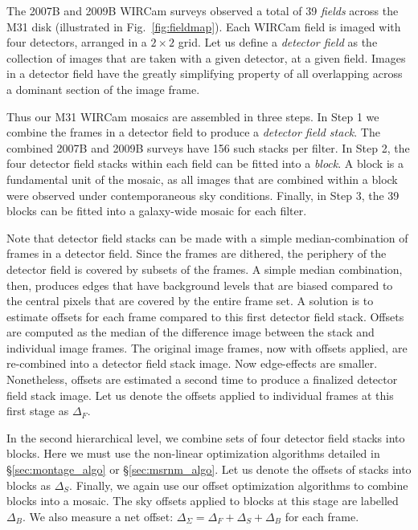 \documentclass[iop]{emulateapj}
\newcommand{\Fig}[1]{Fig.~\ref{fig:#1}}  %
\newcommand{\Sec}[1]{\S\ref{sec:#1}}  %
\begin{document}
The 2007B and 2009B WIRCam surveys observed a total of 39 \emph{fields} across the M31 disk (illustrated in \Fig{fieldmap}).
Each WIRCam field is imaged with four detectors, arranged in a $2\times 2$ grid.
Let us define a \emph{detector field} as the collection of images that are taken with a given detector, at a given field.
Images in a detector field have the greatly simplifying property of all overlapping across a dominant section of the image frame.

Thus our M31 WIRCam mosaics are assembled in three steps.
In Step 1 we combine the frames in a detector field to produce a \emph{detector field stack}.
The combined 2007B and 2009B surveys have 156 such stacks per filter.
In Step 2, the four detector field stacks within each field can be fitted into a \emph{block}.
A block is a fundamental unit of the mosaic, as all images that are combined within a block were observed under contemporaneous sky conditions.
Finally, in Step 3, the 39 blocks can be fitted into a galaxy-wide mosaic for each filter.

Note that detector field stacks can be made with a simple median-combination of frames in a detector field.
Since the frames are dithered, the periphery of the detector field is covered by subsets of the frames.
A simple median combination, then, produces edges that have background levels that are biased compared to the central pixels that are covered by the entire frame set.
A solution is to estimate offsets for each frame compared to this first detector field stack.
Offsets are computed as the median of the difference image between the stack and individual image frames.
The original image frames, now with offsets applied, are re-combined into a detector field stack image.
Now edge-effects are smaller.
Nonetheless, offsets are estimated a second time to produce a finalized detector field stack image.
Let us denote the offsets applied to individual frames at this first stage as $\Delta_F$.

In the second hierarchical level, we combine sets of four detector field stacks into blocks.
Here we must use the non-linear optimization algorithms detailed in \Sec{montage_algo} or \Sec{msrnm_algo}.
Let us denote the offsets of stacks into blocks as $\Delta_S$. Finally, we again use our offset optimization algorithms to combine blocks into a mosaic. The sky offsets applied to blocks at this stage are labelled $\Delta_B$. We also measure a net offset: $\Delta_\Sigma = \Delta_F + \Delta_S + \Delta_B$ for each frame.
\end{document}
